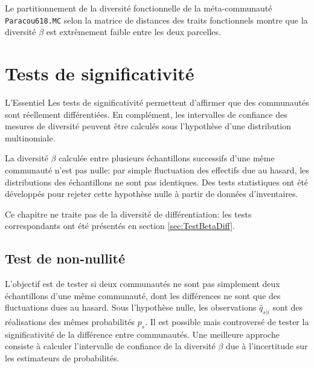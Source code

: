 \documentclass[
  11pt,
  french,
  a4paper,
  extrafontsizes,onecolumn,openright
  ]{memoir}
\newenvironment{Summary}
  {\begin{bclogo}[logo=\bctrombone, noborder=true, couleur=lightgray!50]{L'Essentiel}\parindent0pt}
  {\end{bclogo}}
\begin{document}
\normalsize

Le partitionnement de la diversité fonctionnelle de la méta-communauté \texttt{Paracou618.MC} selon la matrice de distances des traits fonctionnels montre que la diversité \(\beta\) est extrêmement faible entre les deux parcelles.

\hypertarget{tests-de-significativituxe9}{%
\chapter{Tests de significativité}\label{tests-de-significativituxe9}}

\scriptsize

\begin{Summary}
Les tests de significativité permettent d'affirmer que des communautés
sont réellement différentiées. En complément, les intervalles de
confiance des mesures de diversité peuvent être calculés sous
l'hypothèse d'une distribution multinomiale.
\end{Summary}

\normalsize

La diversité \(\beta\) calculée entre plusieurs échantillons successifs d'une même communauté n'est pas nulle: par simple fluctuation des effectifs due au hasard, les distributions des échantillons ne sont pas identiques.
Des tests statistiques ont été développés pour rejeter cette hypothèse nulle à partir de données d'inventaires.

Ce chapitre ne traite pas de la diversité de différentiation: les tests correspondants ont été présentés en section \ref{sec:TestBetaDiff}.

\hypertarget{test-de-non-nullituxe9-1}{%
\section{Test de non-nullité}\label{test-de-non-nullituxe9-1}}

L'objectif est de tester si deux communautés ne sont pas simplement deux échantillons d'une même communauté, dont les différences ne sont que des fluctuations dues au hasard.
Sous l'hypothèse nulle, les observations \(\hat{q}_{s|i}\) sont des réalisations des mêmes probabilités \(p_s\).
Il est possible \autocite{Crist2003} mais controversé \autocite{Jones1986} de tester la significativité de la différence entre communautés.
Une meilleure approche consiste à calculer l'intervalle de confiance de la diversité \(\beta\) due à l'incertitude sur les estimateurs de probabilités.
\end{document}
